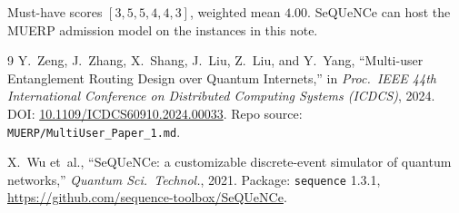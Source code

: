 \documentclass[11pt]{article}
\begin{document}
Must-have scores $[3,5,5,4,4,3]$, weighted mean $4.00$.
SeQUeNCe can host the MUERP admission model on the instances in this note.

\begin{thebibliography}{9}
Y.\ Zeng, J.\ Zhang, X.\ Shang, J.\ Liu, Z.\ Liu, and Y.\ Yang,
``Multi-user Entanglement Routing Design over Quantum Internets,''
in \textit{Proc.\ IEEE 44th International Conference on Distributed Computing Systems (ICDCS)}, 2024.
DOI: \href{https://doi.org/10.1109/ICDCS60910.2024.00033}{10.1109/ICDCS60910.2024.00033}.
Repo source: \texttt{MUERP/MultiUser\_Paper\_1.md}.

X.\ Wu et~al.,
``SeQUeNCe: a customizable discrete-event simulator of quantum networks,''
\textit{Quantum Sci.\ Technol.}, 2021.
Package: \texttt{sequence} 1.3.1, \url{https://github.com/sequence-toolbox/SeQUeNCe}.
\end{thebibliography}
\end{document}
